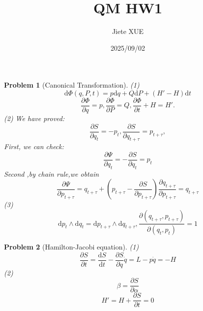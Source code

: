 \documentclass{article}
\title{QM HW1}
\author{Jiete XUE}
\date{2025/09/02}
\theoremstyle{t}
\newtheorem{problem}{Problem}
\newcommand{\dd}{\mathrm{d}}
\newcommand{\pa}{\partial}
\begin{document}
\maketitle
\begin{problem}[Canonical Transformation]
(1)\begin{equation}
   \dd \Phi(q,P,t)=p\dd q+Q\dd P+(H'-H)\dd t 
\end{equation}
\begin{equation}
    \frac{\partial \Phi}{\partial q}=p,\frac{\partial \Phi}{\partial P}=Q,\frac{\partial \Phi}{\partial t}+H=H'.
\end{equation}
(2) We have proved:
\begin{equation}
    \frac{\partial S}{\partial q_t}=-p_t,\frac{\partial S}{\partial q_{t+\tau}}=p_{t+\tau},
\end{equation}
First, we can check:
\begin{equation}
    \frac{\partial \Psi}{\partial q_t}=-\frac{\partial S}{\partial q_t}=p_t
\end{equation}
Second ,by chain rule,we obtain
\begin{equation}
    \frac{\partial \Psi }{\partial p_{t+\tau}}=q_{t+\tau}+\left( p_{t+\tau}-\frac{\partial S}{\partial p_{t+\tau}}\right)\frac{\partial q_{t+\tau}}{\partial p_{t+\tau}}=q_{t+\tau}
\end{equation}
(3) \begin{equation}
    \dd p_t\wedge\dd q_t=\dd p_{t+\tau}\wedge\dd q_{t+\tau},\frac{\partial(q_{t+\tau},p_{t+\tau})}{\partial(q_t,p_t)}=1
\end{equation}
\end{problem}
\begin{problem}[Hamilton-Jacobi equation]
    (1) \begin{equation}
        \frac{\pa S}{\pa t}=\frac{\dd S}{\dd t}-\frac{\pa S}{\pa q}\dot{q}=L-p\dot{q}=-H
    \end{equation}
    (2) \begin{equation}
        \beta=\frac{\pa S}{\pa \alpha}
    \end{equation}
    \begin{equation}
        H'=H+\frac{\pa S}{\pa t}=0
    \end{equation}
\end{problem}
\end{document}
